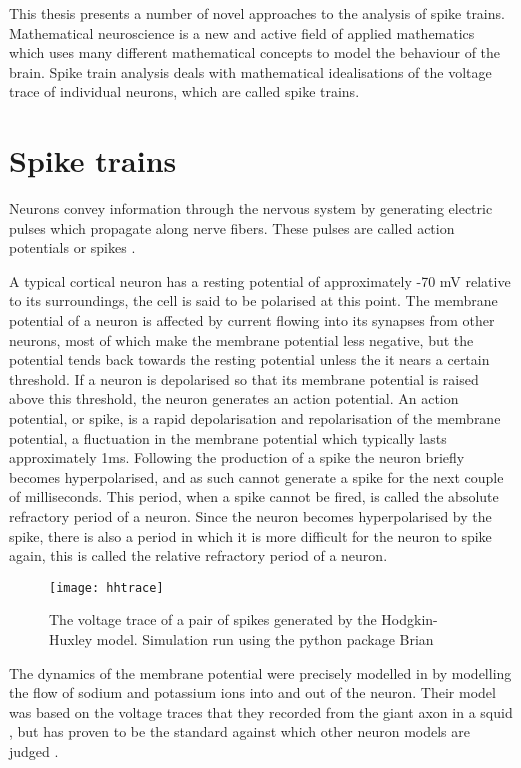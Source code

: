 This thesis presents a number of novel approaches to the analysis of spike trains. Mathematical neuroscience is a new and active field of applied mathematics which uses many different mathematical concepts to model the behaviour of the brain.  Spike train analysis deals with mathematical idealisations of the voltage trace of individual neurons, which are called spike trains.



\section{Spike trains}

Neurons convey information through the nervous system by generating
electric pulses which propagate along nerve fibers.  These pulses are
called action potentials or spikes \cite{DuBoisReymond1884a}. 

A typical cortical neuron has a resting potential of approximately -70 mV relative to
its surroundings, the cell is said to be polarised at this point.
The membrane potential of a neuron is affected by current
flowing into its synapses from other neurons, most of which make the membrane potential less negative, but the potential tends back towards the resting potential
unless the it nears a certain threshold. If a neuron
is depolarised so that its membrane potential is raised above this
threshold, the neuron generates an action potential. An action potential, or 
spike, is a rapid depolarisation and repolarisation of the membrane potential, a fluctuation in the membrane potential which typically lasts 
approximately 1ms. Following the production of a spike the neuron briefly 
becomes hyperpolarised, and as such cannot generate a spike for the next
couple of milliseconds.  This period, when a spike cannot be fired, is
called the absolute refractory period of a neuron.  Since the neuron
becomes hyperpolarised by the spike, there is also a period in which
it is more difficult for the neuron to spike again, this is called
the relative refractory period of a neuron. 

\begin{figure}[htb]
\texttt{[image: hhtrace]}
\caption{The voltage trace of a pair of spikes generated by the Hodgkin-Huxley model.  Simulation run using the python package Brian \cite{GoodmanBrette2008a}}
\end{figure}

The dynamics of the membrane potential were precisely modelled in \cite{HodgkinHuxley1952a} by modelling the flow of sodium and potassium ions into and out of the neuron.  Their model was based on the voltage traces that they recorded from the giant axon in a squid \cite{HodgkinHuxley1939a}, but has proven to be the standard against which other neuron models are judged \cite{Izhikevich2004a}.

